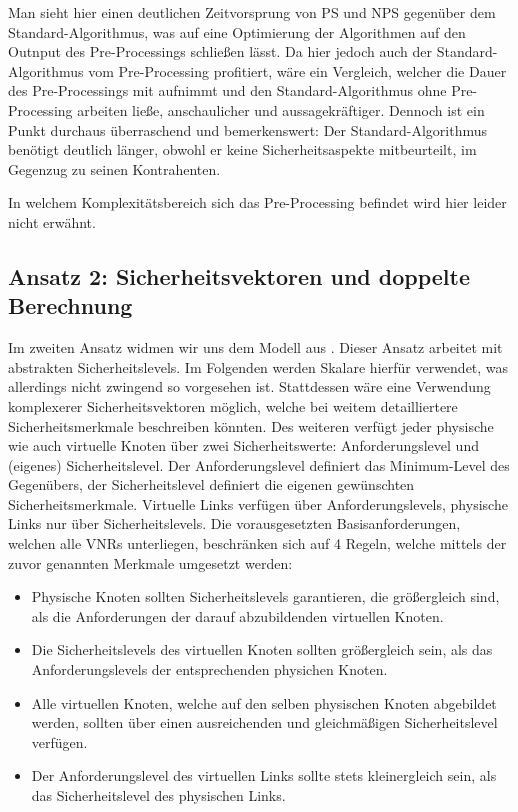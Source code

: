 \documentclass{lni}
\begin{document}
Man sieht  hier einen deutlichen Zeitvorsprung von PS und NPS gegenüber dem Standard-Algorithmus, was auf eine Optimierung der Algorithmen auf den Outnput des Pre-Processings schließen lässt. Da hier jedoch auch der Standard-Algorithmus vom Pre-Processing profitiert, wäre ein Vergleich, welcher die Dauer des Pre-Processings mit aufnimmt und den Standard-Algorithmus ohne Pre-Processing arbeiten ließe, anschaulicher und aussagekräftiger.
Dennoch ist ein Punkt durchaus überraschend und bemerkenswert: Der Standard-Algorithmus benötigt deutlich länger, obwohl er keine Sicherheitsaspekte mitbeurteilt, im Gegenzug zu seinen Kontrahenten.

In welchem Komplexitätsbereich sich das Pre-Processing befindet wird hier leider nicht erwähnt.


\subsection{Ansatz 2: Sicherheitsvektoren und doppelte Berechnung}
\label{subsec:ansatz2}

Im zweiten Ansatz widmen wir uns dem Modell aus \cite{algo2}. Dieser Ansatz arbeitet mit abstrakten Sicherheitslevels. Im Folgenden werden Skalare hierfür verwendet, was allerdings nicht zwingend so vorgesehen ist. Stattdessen wäre eine Verwendung komplexerer Sicherheitsvektoren möglich, welche bei weitem detailliertere Sicherheitsmerkmale  beschreiben könnten. Des weiteren verfügt jeder physische wie auch virtuelle Knoten über zwei Sicherheitswerte: Anforderungslevel und (eigenes) Sicherheitslevel. Der Anforderungslevel definiert das Minimum-Level des Gegenübers, der Sicherheitslevel definiert die eigenen gewünschten Sicherheitsmerkmale. Virtuelle Links verfügen über Anforderungslevels, physische Links nur über Sicherheitslevels. Die vorausgesetzten Basisanforderungen, welchen alle VNRs unterliegen, beschränken sich auf 4 Regeln, welche mittels der zuvor genannten Merkmale umgesetzt werden:
\begin{itemize}
\item Physische Knoten sollten Sicherheitslevels garantieren, 
   die größergleich sind, als die Anforderungen der darauf abzubildenden
   virtuellen Knoten.

\item Die Sicherheitslevels des virtuellen Knoten sollten größergleich sein, 
   als das Anforderungslevels der entsprechenden physichen Knoten.

\item Alle virtuellen Knoten, welche auf den selben physischen Knoten
   abgebildet werden, sollten über einen ausreichenden und gleichmäßigen Sicherheitslevel
   verfügen. 

\item Der Anforderungslevel des virtuellen Links sollte stets kleinergleich
   sein, als das Sicherheitslevel des physischen Links.
\end{itemize}
\end{document}
